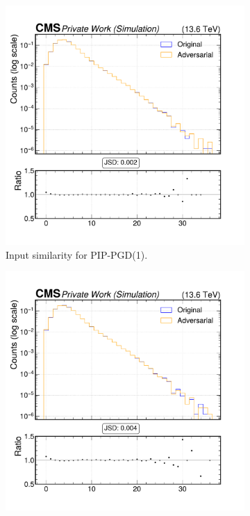 \begin{figure}[htbp]
  \centering
  \begin{subfigure}[t]{0.32\textwidth}
    \includegraphics[width=\linewidth]{media/output/features/compare/combined_it_1/cmp_global_features_TagVarCSV_jetNSelectedTracks.pdf}
    \caption*{Input similarity for PIP-PGD(1).}
  \end{subfigure}\hfill
  \begin{subfigure}[t]{0.32\textwidth}
    \includegraphics[width=\linewidth]{media/output/features/compare/combined_it_2/cmp_global_features_TagVarCSV_jetNSelectedTracks.pdf}

\end{subfigure}
\end{figure}

